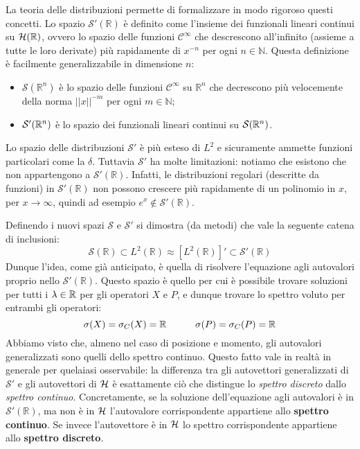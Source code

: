 \documentclass[../../FisicaTeorica.tex]{subfiles}
\begin{document}
La teoria delle distribuzioni permette di formalizzare in modo rigoroso questi concetti. Lo spazio $\mathcal{S}'\left(\mathbb{R}\right)$ è definito come l'insieme dei funzionali lineari continui su $\mathcal{H}(\mathbb{R})$, ovvero lo spazio delle funzioni $\mathcal{C}^\infty$ che descrescono all'infinito (assieme a tutte le loro derivate) più rapidamente di $x^{-n}$ per ogni $n \in \mathbb N$. Questa definizione è facilmente generalizzabile in dimensione $n$:
\begin{itemize}
    \item $\mathcal{S}\left(\mathbb{R}^n\right)$ è lo spazio delle funzioni $\mathcal{C}^\infty$ su $\mathbb{R}^n$ che decrescono più velocemente della norma $\left|\left|x\right|\right|^{-m}$ per ogni $m \in \mathbb N$;
    \item $\mathcal{S}'(\mathbb{R}^n)$ è lo spazio dei funzionali lineari continui su $\mathcal{S}(\mathbb{R}^n)$.
\end{itemize}
\begin{oss}
Lo spazio delle distribuzioni $\mathcal S'$ è più esteso di $L^2$ e sicuramente ammette funzioni particolari come la $\delta$. Tuttavia $\mathcal S'$ ha molte limitazioni: notiamo che esistono  che non appartengono a $\mathcal{S}'(\mathbb {R})$. Infatti, le distribuzioni regolari (descritte da funzioni) in $\mathcal{S}'(\mathbb R)$ non possono crescere più rapidamente  di un polinomio in $x$, per $x\rightarrow \infty$, quindi ad esempio $e^x\notin \mathcal{S}'\left(\mathbb{R}\right)$.
\end{oss}
Definendo i nuovi spazi $\mathcal S$ e $\mathcal S'$ si dimostra (da metodi) che vale la seguente catena di inclusioni:
\begin{equation}
\mathcal S\left(\mathbb{R}\right)\subset L^2\left(\mathbb{R}\right) \approx [L^2\left(\mathbb{R}\right)]' \subset \mathcal{S}'\left(\mathbb{R}\right)
\label{eqn:triplettametodi}
\end{equation}
Dunque l'idea, come già anticipato, è quella di risolvere l'equazione agli autovalori proprio nello  $\mathcal{S}'(\mathbb R)$. Questo spazio è quello per cui è possibile trovare soluzioni per tutti i $\lambda \in \mathbb{R}$ per gli operatori $X$ e $P$, e dunque trovare lo spettro voluto per entrambi gli operatori:
\[
\sigma(X) = \sigma_C(X) = \mathbb{R} \qquad \quad \sigma(P) = \sigma_C(P) = \mathbb{R}
\]
Abbiamo visto che, almeno nel caso di posizione e momento, gli autovalori generalizzati sono quelli dello spettro continuo. Questo fatto vale in realtà in generale per quelaiasi osservabile: la differenza tra gli autovettori generalizzati di $\mathcal{S}'$ e gli autovettori  di $\mathcal{H}$ è esattamente ciò che distingue lo \textit{spettro discreto} dallo \textit{spettro continuo}.
Concretamente, se la soluzione dell'equazione agli autovalori è in $\mathcal{S}'\left(\mathbb{R}\right)$, ma non è in $\mathcal{H}$ l'autovalore corrispondente appartiene allo \textbf{spettro continuo}. Se invece l'autovettore è in $\mathcal{H}$ lo spettro corrispondente appartiene allo \textbf{spettro discreto}.\\
\end{document}
